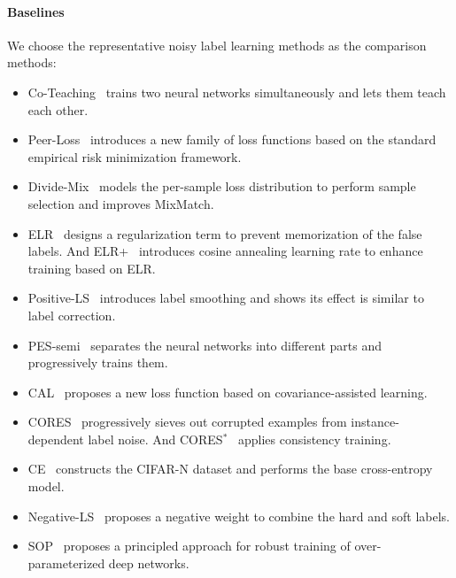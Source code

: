 \documentclass[letterpaper]{article} %
\begin{document}
\paragraph{Baselines}
We choose the representative noisy label learning methods as the comparison methods:
\begin{itemize}
    \item Co-Teaching~\cite{DBLP:conf/nips/HanYYNXHTS18} trains two neural networks simultaneously and lets them teach each other.
    \item Peer-Loss~\cite{DBLP:conf/icml/LiuG20} introduces a new family of loss functions based on the standard empirical risk minimization framework.
    \item Divide-Mix~\cite{DBLP:conf/iclr/LiSH20} models the per-sample loss distribution to perform sample selection and improves MixMatch.
    \item ELR~\cite{DBLP:conf/nips/LiuNRF20} designs a regularization term to prevent memorization of the false labels. And ELR+~\cite{DBLP:conf/nips/LiuNRF20} introduces cosine annealing learning rate to enhance training based on ELR.
\item Positive-LS~\cite{DBLP:conf/icml/LukasikBMK20} introduces label smoothing and shows its effect is similar to label correction.
\item PES-semi~\cite{DBLP:conf/nips/BaiYHYLMNL21} separates the neural networks into different parts and progressively trains them.
\item CAL~\cite{DBLP:conf/cvpr/ZhuL021} proposes a new loss function based on covariance-assisted learning.
\item CORES~\cite{DBLP:conf/iclr/ChengZLGSL21} progressively sieves out corrupted examples from instance-dependent label noise. And CORES$^{*}$~\cite{DBLP:conf/iclr/ChengZLGSL21} applies consistency training.
\item  CE~\cite{DBLP:conf/iclr/WeiZ0L0022} constructs the CIFAR-N dataset and performs the base cross-entropy model.
\item  Negative-LS~\cite{DBLP:conf/icml/WeiLL0SL22} proposes a negative weight to combine the hard and soft labels.
\item SOP~\cite{DBLP:conf/icml/LiuZQY22} proposes a principled approach for robust training of over-parameterized deep networks.
\end{itemize}
\end{document}
